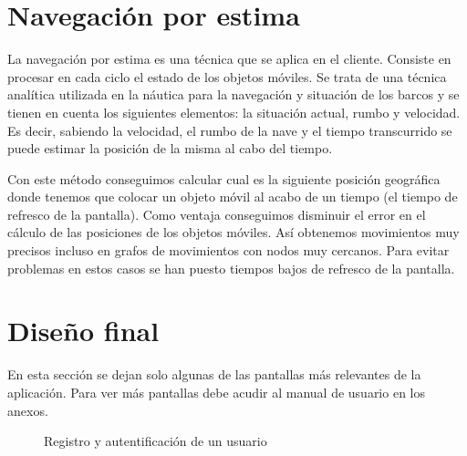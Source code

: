 \newpage

\section{Navegación por estima}


La navegación por estima es una técnica que se aplica en el cliente. Consiste en procesar en cada ciclo el estado de los objetos móviles. Se trata de una técnica analítica utilizada en la náutica para la navegación y situación de los barcos y se tienen en cuenta los siguientes elementos: la situación actual, rumbo y velocidad. Es decir, sabiendo la velocidad, el rumbo de la nave y el tiempo transcurrido se puede estimar la posición de la misma al cabo del tiempo. 

Con este método conseguimos calcular cual es la siguiente posición geográfica donde tenemos que colocar un objeto móvil al acabo de un tiempo (el tiempo de refresco de la pantalla). Como ventaja conseguimos disminuir el error en el cálculo de las posiciones de los objetos móviles. Así obtenemos movimientos muy precisos incluso en grafos de movimientos con nodos muy cercanos. Para evitar problemas en estos casos se han puesto tiempos bajos de refresco de la pantalla.

\section{Diseño final}

En esta sección se dejan solo algunas de las pantallas más relevantes de la aplicación. Para ver más pantallas debe acudir al manual de usuario en los anexos.

\begin{figure}[H]
 \centering
 \caption{Registro y autentificación de un usuario}
 \label{f:LoginRegister}
\end{figure}

